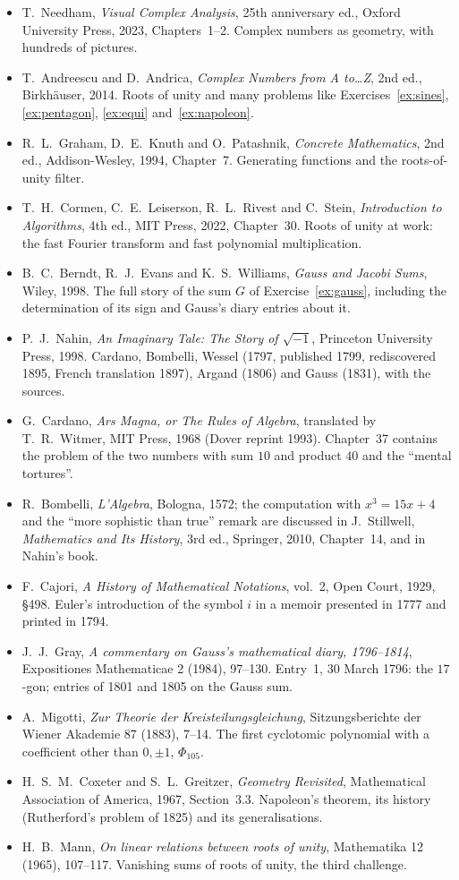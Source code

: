 \begin{itemize}\raggedright
\item T.~Needham, \emph{Visual Complex Analysis}, 25th anniversary ed., Oxford University Press, 2023, Chapters~1--2. Complex numbers as geometry, with hundreds of pictures.
\item T.~Andreescu and D.~Andrica, \emph{Complex Numbers from A to\dots Z}, 2nd ed., Birkh\"auser, 2014. Roots of unity and many problems like Exercises~\ref{ex:sines}, \ref{ex:pentagon}, \ref{ex:equi} and~\ref{ex:napoleon}.
\item R.~L.~Graham, D.~E.~Knuth and O.~Patashnik, \emph{Concrete Mathematics}, 2nd ed., Addison-Wesley, 1994, Chapter~7. Generating functions and the roots-of-unity filter.
\item T.~H.~Cormen, C.~E.~Leiserson, R.~L.~Rivest and C.~Stein, \emph{Introduction to Algorithms}, 4th ed., MIT Press, 2022, Chapter~30. Roots of unity at work: the fast Fourier transform and fast polynomial multiplication.
\item B.~C.~Berndt, R.~J.~Evans and K.~S.~Williams, \emph{Gauss and Jacobi Sums}, Wiley, 1998. The full story of the sum $G$ of Exercise~\ref{ex:gauss}, including the determination of its sign and Gauss's diary entries about it.
\item P.~J.~Nahin, \emph{An Imaginary Tale: The Story of $\sqrt{-1}$}, Princeton University Press, 1998. Cardano, Bombelli, Wessel (1797, published 1799, rediscovered 1895, French translation 1897), Argand (1806) and Gauss (1831), with the sources.
\item G.~Cardano, \emph{Ars Magna, or The Rules of Algebra}, translated by T.~R.~Witmer, MIT Press, 1968 (Dover reprint 1993). Chapter~37 contains the problem of the two numbers with sum $10$ and product $40$ and the ``mental tortures''.
\item R.~Bombelli, \emph{L'Algebra}, Bologna, 1572; the computation with $x^3=15x+4$ and the ``more sophistic than true'' remark are discussed in J.~Stillwell, \emph{Mathematics and Its History}, 3rd ed., Springer, 2010, Chapter~14, and in Nahin's book.
\item F.~Cajori, \emph{A History of Mathematical Notations}, vol.~2, Open Court, 1929, \S498. Euler's introduction of the symbol $i$ in a memoir presented in 1777 and printed in 1794.
\item J.~J.~Gray, \emph{A commentary on Gauss's mathematical diary, 1796--1814}, Expositiones Mathematicae 2 (1984), 97--130. Entry~1, 30 March 1796: the $17$-gon; entries of 1801 and 1805 on the Gauss sum.
\item A.~Migotti, \emph{Zur Theorie der Kreisteilungsgleichung}, Sitzungsberichte der Wiener Akademie 87 (1883), 7--14. The first cyclotomic polynomial with a coefficient other than $0,\pm1$, $\Phi_{105}$.
\item H.~S.~M.~Coxeter and S.~L.~Greitzer, \emph{Geometry Revisited}, Mathematical Association of America, 1967, Section~3.3. Napoleon's theorem, its history (Rutherford's problem of 1825) and its generalisations.
\item H.~B.~Mann, \emph{On linear relations between roots of unity}, Mathematika 12 (1965), 107--117. Vanishing sums of roots of unity, the third challenge.
\end{itemize}
